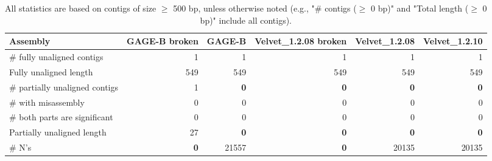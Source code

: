 \documentclass[12pt,a4paper]{article}
\begin{document}
\begin{table}[ht]
\begin{center}
\caption{All statistics are based on contigs of size $\geq$ 500 bp, unless otherwise noted (e.g., "\# contigs ($\geq$ 0 bp)" and "Total length ($\geq$ 0 bp)" include all contigs).}
\begin{tabular}{|l*{5}{|r}|}
\hline
Assembly & GAGE-B broken & GAGE-B & Velvet\_1.2.08 broken & Velvet\_1.2.08 & Velvet\_1.2.10 \\ \hline
\# fully unaligned contigs & 1 & 1 & 1 & 1 & 1 \\ \hline
Fully unaligned length & 549 & 549 & 549 & 549 & 549 \\ \hline
\# partially unaligned contigs & 1 & {\bf 0} & {\bf 0} & {\bf 0} & {\bf 0} \\ \hline
\hspace{5mm}\# with misassembly & 0 & 0 & 0 & 0 & 0 \\ \hline
\hspace{5mm}\# both parts are significant & 0 & 0 & 0 & 0 & 0 \\ \hline
Partially unaligned length & 27 & {\bf 0} & {\bf 0} & {\bf 0} & {\bf 0} \\ \hline
\# N's & {\bf 0} & 21557 & {\bf 0} & 20135 & 20135 \\ \hline
\end{tabular}
\end{center}
\end{table}
\end{document}
